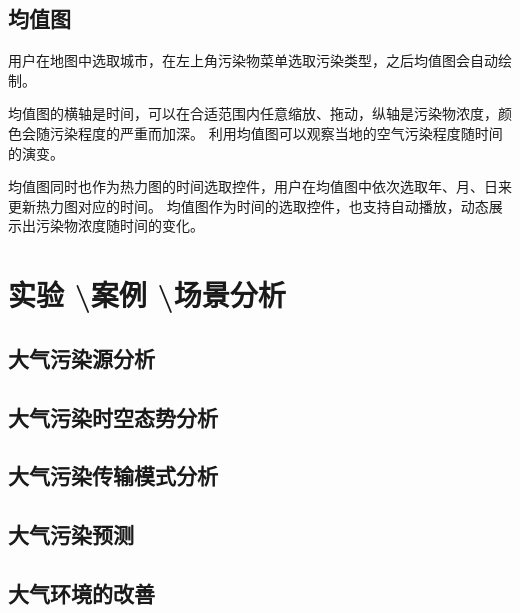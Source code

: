 \documentclass[UTF8]{ctexrep}
\begin{document}
    \subsection{均值图}
    用户在地图中选取城市，在左上角污染物菜单选取污染类型，之后均值图会自动绘制。
    \par
    均值图的横轴是时间，可以在合适范围内任意缩放、拖动，纵轴是污染物浓度，颜色会随污染程度的严重而加深。
    利用均值图可以观察当地的空气污染程度随时间的演变。
    \par
    均值图同时也作为热力图的时间选取控件，用户在均值图中依次选取年、月、日来更新热力图对应的时间。
    均值图作为时间的选取控件，也支持自动播放，动态展示出污染物浓度随时间的变化。
    \par

    \section{实验 \textbackslash 案例 \textbackslash 场景分析}

    \subsection{大气污染源分析}

    \subsection{大气污染时空态势分析}

    \subsection{大气污染传输模式分析}

    \subsection{大气污染预测}

    \subsection{大气环境的改善}
\end{document}
